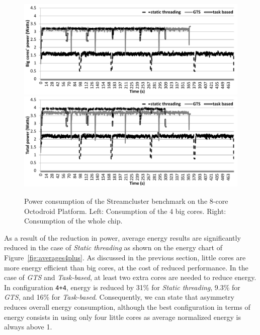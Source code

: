 \begin{figure}
        \centering
        \includegraphics[width=\columnwidth]{figures/stream_samples_A15} \hspace{0.2cm}
        \includegraphics[width=\columnwidth]{figures/stream_samples_total}%
        \vspace{-0.3cm}
        \caption{Power consumption of the Streamcluster benchmark on the 8-core Octodroid Platform. Left: Consumption of the 4 big cores. Right: Consumption of the whole chip.}%
        \label{fig:streamcluster_consumption_evolution}%
\end{figure}

As a result of the reduction in power, average energy results are significantly reduced in the case of \emph{Static threading} as shown on the energy chart of Figure~\ref{fig:averages4plus}. As discussed in the previous section, little cores are more energy efficient than big cores, at the cost of reduced performance. In the case of \emph{GTS} and \emph{Task-based}, at least two extra cores are needed to reduce energy. In configuration \texttt{4+4}, energy is reduced by 31\% for \emph{Static threading}, 9.3\% for \emph{GTS}, and 16\% for \emph{Task-based}. Consequently, we can state that asymmetry reduces overall energy consumption, although the best configuration in terms of energy consists in using only four little cores as average normalized energy is always above 1.

